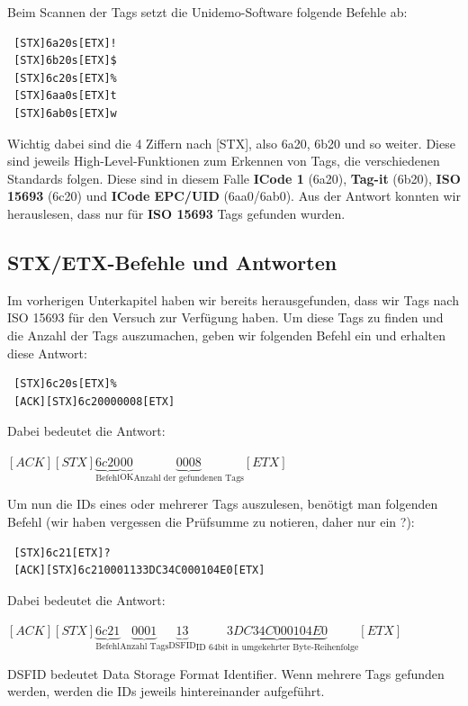 \documentclass[paper=a4,fontsize=11pt,headsepline,footsepline,parskip=half]{scrartcl}
\begin{document}
Beim Scannen der Tags setzt die Unidemo-Software folgende Befehle ab:

\begin{lstlisting}
 [STX]6a20s[ETX]!
 [STX]6b20s[ETX]$
 [STX]6c20s[ETX]%
 [STX]6aa0s[ETX]t
 [STX]6ab0s[ETX]w
\end{lstlisting}

Wichtig dabei sind die 4 Ziffern nach [STX], also 6a20, 6b20 und so weiter. Diese sind jeweils High-Level-Funktionen zum Erkennen von Tags,
die verschiedenen Standards folgen. Diese sind in diesem Falle \textbf{ICode 1} (6a20), \textbf{Tag-it} (6b20), \textbf{ISO 15693} (6c20) und
\textbf{ICode EPC/UID} (6aa0/6ab0). Aus der Antwort konnten wir herauslesen, dass nur für \textbf{ISO 15693} Tags gefunden wurden.

\subsection{STX/ETX-Befehle und Antworten}

Im vorherigen Unterkapitel haben wir bereits herausgefunden, dass wir Tags nach ISO 15693 für den Versuch zur Verfügung haben. Um diese Tags zu
finden und die Anzahl der Tags auszumachen, geben wir folgenden Befehl ein und erhalten diese Antwort:

\begin{lstlisting}
 [STX]6c20s[ETX]%
 [ACK][STX]6c20000008[ETX]
\end{lstlisting}

Dabei bedeutet die Antwort:

$[ACK][STX]\underbrace{6c20}_{\text{Befehl}}\underbrace{00}_{\text{OK}}\underbrace{0008}_{\text{Anzahl der gefundenen Tags}}[ETX]$

Um nun die IDs eines oder mehrerer Tags auszulesen, benötigt man folgenden Befehl (wir haben vergessen die Prüfsumme zu notieren, daher nur ein ?):

\begin{lstlisting}
 [STX]6c21[ETX]?
 [ACK][STX]6c210001133DC34C000104E0[ETX]
\end{lstlisting}

Dabei bedeutet die Antwort:

$[ACK][STX]\underbrace{6c21}_{\text{Befehl}}\underbrace{0001}_{\text{Anzahl Tags}}\underbrace{13}_{\text{DSFID}}\underbrace{3DC34C000104E0}_{\text{ID 64bit in umgekehrter Byte-Reihenfolge}}[ETX]$

DSFID bedeutet Data Storage Format Identifier. Wenn mehrere Tags gefunden werden, werden die IDs jeweils hintereinander aufgeführt.
\end{document}
